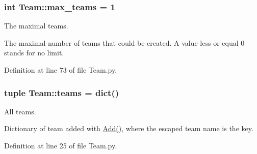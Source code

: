 \hypertarget{namespace_team_a96b76de309ef42248f9ef90cc57bb21b}{
\subsubsection[{max\-\_\-teams}]{\setlength{\rightskip}{0pt plus 5cm}int {\bf \-Team\-::max\-\_\-teams} = 1}}
\label{namespace_team_a96b76de309ef42248f9ef90cc57bb21b}


\-The maximal teams. 

\-The maximal number of teams that could be created. \-A value less or equal 0 stands for no limit. 

\-Definition at line 73 of file \-Team.\-py.

\hypertarget{namespace_team_ac7c0217a52a864ca264b5f0e056e44bf}{
\subsubsection[{teams}]{\setlength{\rightskip}{0pt plus 5cm}tuple {\bf \-Team\-::teams} = dict()}}
\label{namespace_team_ac7c0217a52a864ca264b5f0e056e44bf}


\-All teams. 

\-Dictionary of team added with \hyperlink{namespace_team_a3aa3c6d7d30a6d820bf641e0bc95e8c0}{\-Add()}, where the escaped team name is the key. 

\-Definition at line 25 of file \-Team.\-py.

